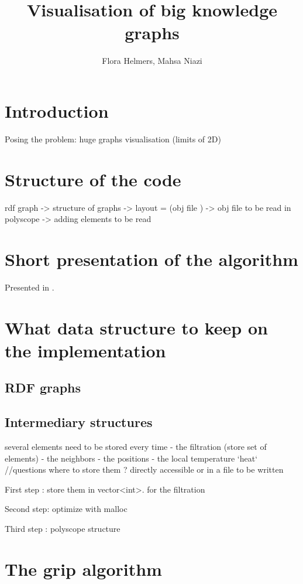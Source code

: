 \documentclass{article}
\title{Visualisation of big knowledge graphs}
\author{Flora Helmers, Mahsa Niazi}
\begin{document}
\maketitle

\section*{Introduction}
Posing the problem:
huge graphs 
visualisation (limits of 2D)


\section{Structure of the code}
rdf graph
-> 
structure of graphs
-> 
layout = (obj file )
-> 
obj file to be read in polyscope
-> 
adding elements to be read 

\section{Short presentation of the algorithm}
Presented in \cite{gajer00}. 

\section{What data structure to keep on the implementation}
\subsection{RDF  graphs}

\subsection{Intermediary structures}
several elements need to be stored every time 
- the filtration (store set of elements)
- the neighbors
- the positions 
- the local temperature `heat` 
//questions where to store them ? directly accessible or in a file to be written

First step : store them in vector<int>. 
    for the filtration

Second step: optimize with malloc

Third step : polyscope structure 



\section{The grip algorithm}
\end{document}
